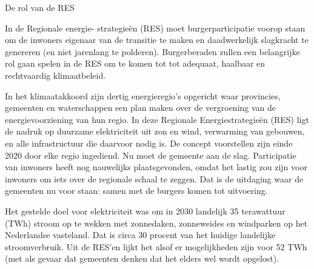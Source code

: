 \begin{voorstel}{De rol van de RES}


\begin{samenvatting}
In de Regionale energie- strategieën (RES) moet burgerparticipatie voorop staan om de inwoners eigenaar van de transitie te maken en daadwerkelijk slagkracht te genereren (en niet jarenlang te polderen). Burgerberaden zullen een belangrijke rol gaan spelen in de RES om te komen tot tot adequaat, haalbaar en rechtvaardig klimaatbeleid. 
\end{samenvatting}

\begin{multicols*}{2}

\begin{uitdaging}
In het klimaatakkoord zijn dertig energieregio’s opgericht waar provincies, gemeenten en waterschappen een plan maken over de vergroening van de energievoorziening van hun regio. In deze Regionale Energiestrategieën (RES) ligt de nadruk op duurzame elektriciteit uit zon en wind, verwarming van gebouwen, en alle infrastructuur die daarvoor nodig is. De concept voorstellen zijn einde 2020 door elke regio ingediend. Nu moet de gemeente aan de slag. Participatie van inwoners heeft nog nauwelijks plaatsgevonden, omdat het lastig zou zijn voor inwoners om iets over de regionale schaal te zeggen. Dat is de uitdaging waar de gemeenten nu voor staan: samen met de burgers komen tot uitvoering.
\end{uitdaging}

\begin{overwegingen}
Het gestelde doel voor elektriciteit was om in 2030 landelijk 35 terawattuur (TWh) stroom op te wekken met zonnedaken, zonneweides en windparken op het Nederlandse vasteland. Dat is circa 30 procent van het huidige landelijke stroomverbruik. Uit de RES’en lijkt het alsof er mogelijkheden zijn voor 52 TWh (met als gevaar dat gemeenten denken dat het elders wel wordt opgelost).


\end{overwegingen}
\end{multicols*}
\end{voorstel}
